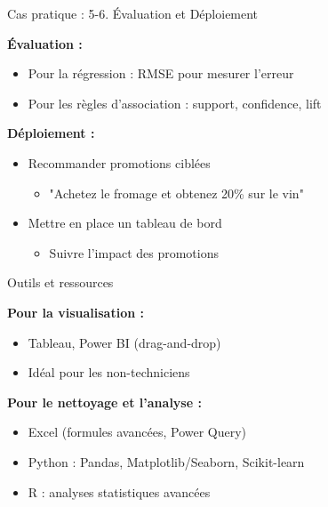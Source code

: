 \begin{frame}{Cas pratique : 5-6. Évaluation et Déploiement}

\textbf{Évaluation :}
\begin{itemize}
    \item Pour la régression : RMSE pour mesurer l'erreur
    \item Pour les règles d'association : support, confidence, lift
\end{itemize}

\vspace{0.3cm}

\textbf{Déploiement :}
\begin{itemize}
    \item Recommander promotions ciblées
        \begin{itemize}
            \item "Achetez le fromage et obtenez 20\% sur le vin"
        \end{itemize}
    \item Mettre en place un tableau de bord
        \begin{itemize}
            \item Suivre l'impact des promotions
        \end{itemize}
\end{itemize}

\end{frame}

\begin{frame}{Outils et ressources}

\textbf{Pour la visualisation :}
\begin{itemize}
    \item Tableau, Power BI (drag-and-drop)
    \item Idéal pour les non-techniciens
\end{itemize}

\vspace{0.3cm}

\textbf{Pour le nettoyage et l'analyse :}
\begin{itemize}
    \item Excel (formules avancées, Power Query)
    \item Python : Pandas, Matplotlib/Seaborn, Scikit-learn
    \item R : analyses statistiques avancées
\end{itemize}

\end{frame}

